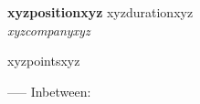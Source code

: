 \noindent\textbf{xyzpositionxyz} \hfill xyzdurationxyz \\
\textit{xyzcompanyxyz}
\begin{itemize}
xyzpointsxyz
\end{itemize}
-----
Inbetween: \vspace{-4pt}
